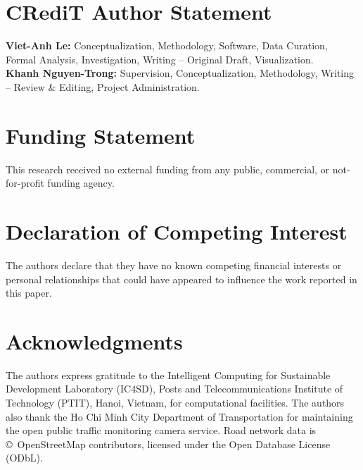 \documentclass[preprint,12pt]{elsarticle}
\begin{document}
\section{CRediT Author Statement}
\textbf{Viet-Anh Le:} Conceptualization, Methodology, Software, Data Curation, Formal Analysis, Investigation, Writing -- Original Draft, Visualization. \\
\textbf{Khanh Nguyen-Trong:} Supervision, Conceptualization, Methodology, Writing -- Review \& Editing, Project Administration.

\section{Funding Statement}
This research received no external funding from any public, commercial, or not-for-profit funding agency.

\section{Declaration of Competing Interest}
The authors declare that they have no known competing financial interests or personal relationships that could have appeared to influence the work reported in this paper.

\section{Acknowledgments}
The authors express gratitude to the Intelligent Computing for Sustainable Development Laboratory (IC4SD), Posts and Telecommunications Institute of Technology (PTIT), Hanoi, Vietnam, for computational facilities. The authors also thank the Ho Chi Minh City Department of Transportation for maintaining the open public traffic monitoring camera service. Road network data is \copyright\ OpenStreetMap contributors, licensed under the Open Database License (ODbL).



\end{document}
